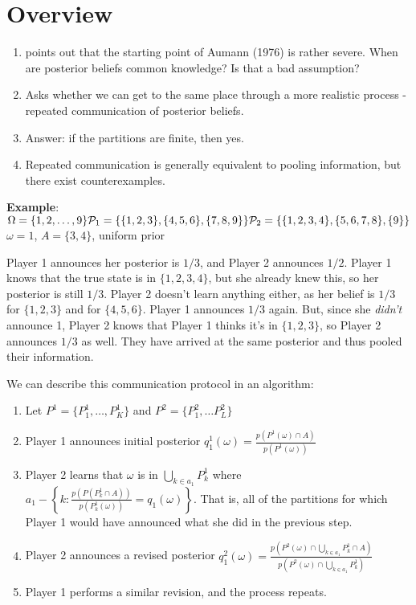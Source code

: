 
\section*{Overview}
\begin{enumerate}
	\item points out that the starting point of Aumann (1976) is rather severe.  When are posterior beliefs common knowledge? Is that a bad assumption?
	\item Asks whether we can get to the same place through a more realistic process - repeated communication of posterior beliefs.
	\item Answer: if the partitions are finite, then yes.
	\item Repeated communication is generally equivalent to pooling information, but there exist counterexamples.
\end{enumerate}

\textbf{Example}:\\
$\Omega = \{1,2,\dots,9\}\\\mathcal{P}_1=\{\{1,2,3\},\{4,5,6\},\{7,8,9\}\}\\\mathcal{P}_2=\{\{1,2,3,4\},\{5,6,7,8\},\{9\}\}$\\$\omega=1$, $A=\{3,4\}$, uniform prior

Player 1 announces her posterior is $1/3$, and Player 2 announces $1/2$.  Player 1 knows that the true state is in $\{1,2,3,4\}$, but she already knew this, so her posterior is still $1/3$.  Player 2 doesn't learn anything either, as her belief is $1/3$ for $\{1,2,3\}$ and for $\{4,5,6\}$.  Player 1 announces $1/3$ again.  But, since she \textit{didn't} announce 1, Player 2 knows that Player 1 thinks it's in $\{1,2,3\}$, so Player 2 announces $1/3$ as well.  They have arrived at the same posterior and thus pooled their information.

We can describe this communication protocol in an algorithm:

\begin{enumerate}
	
		
		\item Let $P^1=\{P_1^1,\dots,P_K^1\}$ and $P^2=\{P_1^2,\dots P_L^2\}$
		\item Player 1 announces initial posterior $q_1^1(\omega) = \frac{p(P^1(\omega)\cap A)}{p(P^1(\omega))}$
		\item Player 2 learns that $\omega$ is in $\bigcup\limits_{k\in a_1}P_k^1$ where $a_1-\left\{ k:\frac{p(P(P_k^1\cap A))}{p(P^1_k(\omega))} = q_1(\omega)   \right\}$.  That is, all of the partitions for which Player 1 would have announced what she did in the previous step.
		\item Player 2 announces a revised posterior $q^2_1(\omega) = \frac{p(P^2(\omega)\cap\bigcup\limits_{k\in a_1}P^1_k \cap A)}{p(P^2(\omega)  \cap \bigcup\limits_{k\in a_1}P^1_k  )}$
		\item Player 1 performs a similar revision, and the process repeats.
		

\end{enumerate}
